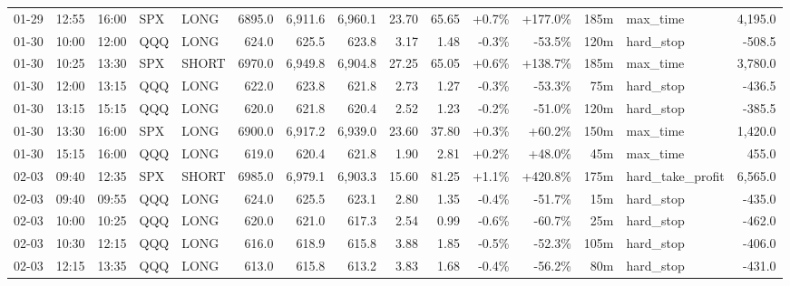 \documentclass[11pt,a4paper,twoside]{article}
\begin{document}
\begin{landscape}
\begin{center}
\begin{longtable}{>{\color{txtmain}}l l l l l r r r r r r r r >{\color{txtmain}}l r}
01-29 & 12:55 & 16:00 & SPX & LONG & 6895.0 & 6,911.6 & 6,960.1 & 23.70 & 65.65 & \textcolor{wingreen}{+0.7\%} & \textcolor{wingreen}{+177.0\%} & 185m & max\_time & \textcolor{wingreen}{4,195.0} \\
01-30 & 10:00 & 12:00 & QQQ & LONG & 624.0 & 625.5 & 623.8 & 3.17 & 1.48 & \textcolor{lossred}{-0.3\%} & \textcolor{lossred}{-53.5\%} & 120m & hard\_stop & \textcolor{lossred}{-508.5} \\
01-30 & 10:25 & 13:30 & SPX & SHORT & 6970.0 & 6,949.8 & 6,904.8 & 27.25 & 65.05 & \textcolor{wingreen}{+0.6\%} & \textcolor{wingreen}{+138.7\%} & 185m & max\_time & \textcolor{wingreen}{3,780.0} \\
01-30 & 12:00 & 13:15 & QQQ & LONG & 622.0 & 623.8 & 621.8 & 2.73 & 1.27 & \textcolor{lossred}{-0.3\%} & \textcolor{lossred}{-53.3\%} & 75m & hard\_stop & \textcolor{lossred}{-436.5} \\
01-30 & 13:15 & 15:15 & QQQ & LONG & 620.0 & 621.8 & 620.4 & 2.52 & 1.23 & \textcolor{lossred}{-0.2\%} & \textcolor{lossred}{-51.0\%} & 120m & hard\_stop & \textcolor{lossred}{-385.5} \\
01-30 & 13:30 & 16:00 & SPX & LONG & 6900.0 & 6,917.2 & 6,939.0 & 23.60 & 37.80 & \textcolor{wingreen}{+0.3\%} & \textcolor{wingreen}{+60.2\%} & 150m & max\_time & \textcolor{wingreen}{1,420.0} \\
01-30 & 15:15 & 16:00 & QQQ & LONG & 619.0 & 620.4 & 621.8 & 1.90 & 2.81 & \textcolor{wingreen}{+0.2\%} & \textcolor{wingreen}{+48.0\%} & 45m & max\_time & \textcolor{wingreen}{455.0} \\
02-03 & 09:40 & 12:35 & SPX & SHORT & 6985.0 & 6,979.1 & 6,903.3 & 15.60 & 81.25 & \textcolor{wingreen}{+1.1\%} & \textcolor{wingreen}{+420.8\%} & 175m & hard\_take\_profit & \textcolor{wingreen}{6,565.0} \\
02-03 & 09:40 & 09:55 & QQQ & LONG & 624.0 & 625.5 & 623.1 & 2.80 & 1.35 & \textcolor{lossred}{-0.4\%} & \textcolor{lossred}{-51.7\%} & 15m & hard\_stop & \textcolor{lossred}{-435.0} \\
02-03 & 10:00 & 10:25 & QQQ & LONG & 620.0 & 621.0 & 617.3 & 2.54 & 0.99 & \textcolor{lossred}{-0.6\%} & \textcolor{lossred}{-60.7\%} & 25m & hard\_stop & \textcolor{lossred}{-462.0} \\
02-03 & 10:30 & 12:15 & QQQ & LONG & 616.0 & 618.9 & 615.8 & 3.88 & 1.85 & \textcolor{lossred}{-0.5\%} & \textcolor{lossred}{-52.3\%} & 105m & hard\_stop & \textcolor{lossred}{-406.0} \\
02-03 & 12:15 & 13:35 & QQQ & LONG & 613.0 & 615.8 & 613.2 & 3.83 & 1.68 & \textcolor{lossred}{-0.4\%} & \textcolor{lossred}{-56.2\%} & 80m & hard\_stop & \textcolor{lossred}{-431.0} \\

\end{longtable}
\end{center}
\end{landscape}
\end{document}
